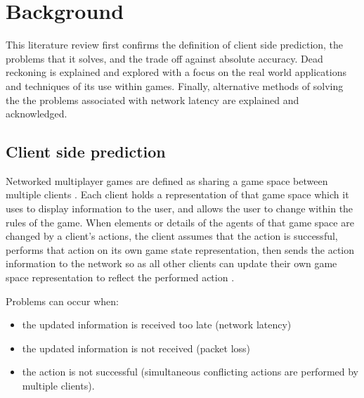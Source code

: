 \documentclass[journal]{IEEEtran}
\begin{document}
\section{Background}

This literature review first confirms the definition of client side prediction, the problems that it solves, and the trade off against absolute accuracy. Dead reckoning is explained and explored with a focus on the real world applications and techniques of its use within games. Finally, alternative methods of solving the the problems associated with network latency are explained and acknowledged.

\subsection{Client side prediction} \label{clientSidePrediction}

Networked multiplayer games are defined as sharing a game space between multiple clients \cite{diot1999distributed}. Each client holds a representation of that game space which it uses to display information to the user, and allows the user to change within the rules of the game. When elements or details of the agents of that game space are changed by a client's actions, the client assumes that the action is successful, performs that action on its own game state representation, then sends the action information to the network so as all other clients can update their own game space representation to reflect the performed action \cite{bernier2001latency}.

Problems can occur when:
\begin{itemize}
    \item the updated information is received too late (network latency)
    \item the updated information is not received (packet loss)
    \item the action is not successful (simultaneous conflicting actions are performed by multiple clients).
\end{itemize}
\end{document}
